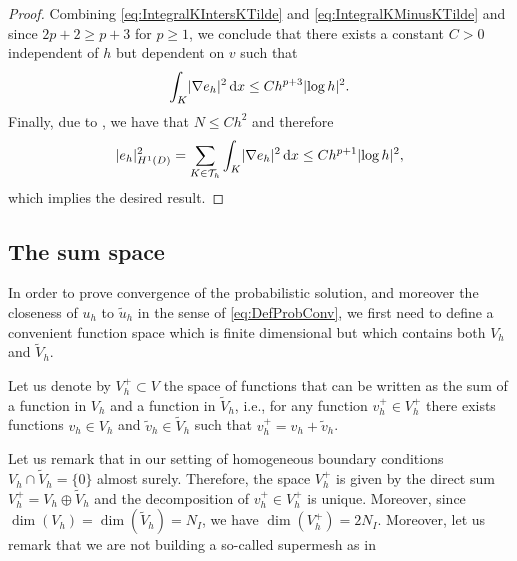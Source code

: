 \begin{proof}
	Combining \eqref{eq:IntegralKIntersKTilde} and \eqref{eq:IntegralKMinusKTilde} and since $2p+2\geq p+3$ for $p \geq 1$, we conclude that there exists a constant $C > 0$ independent of $h$ but dependent on $v$ such that
	\begin{equation}
		\int_K \lvert\nabla  e_h\rvert^2 \,\mathrm{d} x \leq Ch^{p+3}\lvert\log h\rvert^2.
	\end{equation}
	Finally, due to , we have that $N \leq Ch^2$ and therefore
	\begin{equation}
		\lvert e_h\rvert_{H^1(D)}^2 = \sum_{K \in \mathcal T_h} \int_K \lvert\nabla  e_h\rvert^2 \,\mathrm{d} x \leq Ch^{p+1}\lvert\log h\rvert^2,
	\end{equation}
	which implies the desired result.
\end{proof}

\subsection{The sum space}

In order to prove convergence of the probabilistic solution, and moreover the closeness of $u_h$ to $\widetilde u_h$ in the sense of \eqref{eq:DefProbConv}, we first need to define a convenient function space which is finite dimensional but which contains both $V_h$ and $\widetilde V_h$. 

\begin{definition} Let us denote by $V_h^+ \subset V$  the space of functions that can be written as the sum of a function in $V_h$ and a function in $\widetilde V_h$, i.e., for any function $v_h^+ \in V_h^+$ there exists functions $v_h \in V_h$ and $\widetilde v_h \in \widetilde V_h$ such that $v_h^+ = v_h + \widetilde v_h$. 
\end{definition}

\begin{remark} Let us remark that in our setting of homogeneous boundary conditions $V_h \cap \widetilde V_h = \{0\}$ almost surely. Therefore, the space $V_h^+$ is given by the direct sum $V_h^+ = V_h \oplus \widetilde V_h$ and the decomposition of $v_h^+ \in V_h^+$ is unique. Moreover, since $\dim(V_h) = \dim(\widetilde V_h) = N_I$, we have $\dim(V_h^+) = 2N_I$. Moreover, let us remark that we are not building a so-called supermesh as in \cite{FPP09,FaM11, CGR18}
\end{remark}

